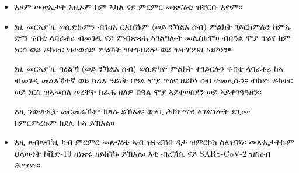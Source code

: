 \documentclass[10pt]{article}
\begin{document}
\begin{itemize}

\item

  እዞም ውጽኢታት እዚኦም ከም ኣካል ናይ ምርምር መጽናዕቲ ዝቐርቡ እዮም።

\item
  ነዚ መርኣያ'ዚ ወሲድኩምን ብገዛእ ርእስኹም (ወይ ንኻልእ ሰብ) ምልክት ገይርክምሉን ከምኡ ድማ ናብቲ ላባራቶሪ
  ብመገዲ ናይ ምብጽጻሕ ኣገልግሎት መሊስክሞ። ብበዓል ሞያ ጥዕና ከም ነርስ ወይ ዶክተር ዝተወስደ፡ ምልክት
  ዝተገብረሉ፡ ወይ ዝተገዓዓዘ ኣይኮነን።

  ነዚ መርኣያ'ዚ ባዕልኻ (ወይ ንኻልእ ሰብ) ወሲድካዮ ምልክት ተገይርሉን ናብቲ ላባራቶሪ ከኣ ብመገዲ መልእኽተኛ
  ወይ ካልእ ዓይነት በዓል ሞያ ጥዕና ዘይኮነ ሰብ ተመሊሱን። ብከም ዶክተር ወይ ነርስ ዝኣመሰለ ወረቐት ስራሕ ዘለዎ
  በዓል ሞያ ኣይተወስደን ወይ ኣይተገዓዓዘን። 



  እዚ ንውጽኢት መርመራኹም ክጸሉ ይኽእል፡ ወሃቢ ሕክምናዊ ኣገልግሎት ደጊሙ ክምርምረኩም ክደሊ ከኣ ይኽእል።

\item

  እዚ ጸብጻብ'ዚ ካብ ምርምር መጽናዕቲ ኣብ ዝተረኽበ ዳታ ዝምርኮስ ስለዝኾነ፡ ውጽኢታትኩም ህላውነት ኮቪድ-19
  ዘነጽሩ ዘይክኾኑ ይኽእሉ፡ እቲ ብረኽሲ ናይ SARS-CoV-2 ዝስዕብ ሕማም።

\end{itemize}
\end{document}
